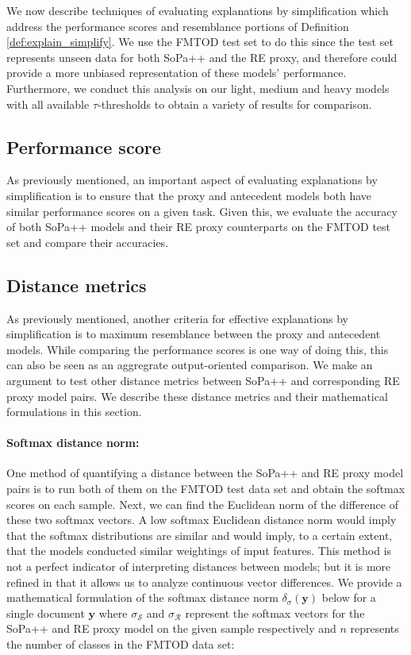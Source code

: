 We now describe techniques of evaluating explanations by simplification which
address the performance scores and resemblance portions of Definition
\ref{def:explain_simplify}. We use the FMTOD test set to do this since the test
set represents unseen data for both SoPa++ and the RE proxy, and therefore could
provide a more unbiased representation of these models' performance.
Furthermore, we conduct this analysis on our light, medium and heavy models with
all available $\tau$-thresholds to obtain a variety of results for comparison.

\subsection{Performance score}

As previously mentioned, an important aspect of evaluating explanations by
simplification is to ensure that the proxy and antecedent models both have
similar performance scores on a given task. Given this, we evaluate the accuracy
of both SoPa++ models and their RE proxy counterparts on the FMTOD test set and
compare their accuracies.

\subsection{Distance metrics}

As previously mentioned, another criteria for effective explanations by
simplification is to maximum resemblance between the proxy and antecedent
models. While comparing the performance scores is one way of doing this, this
can also be seen as an aggregrate output-oriented comparison. We make an
argument to test other distance metrics between SoPa++ and corresponding RE
proxy model pairs. We describe these distance metrics and their mathematical
formulations in this section.

\paragraph{Softmax distance norm:} One method of quantifying a distance between
the SoPa++ and RE proxy model pairs is to run both of them on the FMTOD test
data set and obtain the softmax scores on each sample. Next, we can find the
Euclidean norm of the difference of these two softmax vectors. A low softmax
Euclidean distance norm would imply that the softmax distributions are similar
and would imply, to a certain extent, that the models conducted similar
weightings of input features. This method is not a perfect indicator of
interpreting distances between models; but it is more refined in that it allows
us to analyze continuous vector differences. We provide a mathematical
formulation of the softmax distance norm $\delta_{\sigma}(\bm{y})$ below for a single
document $\bm{y}$ where $\sigma_{\mathcal{S}}$ and $\sigma_{\mathcal{R}}$ represent the
softmax vectors for the SoPa++ and RE proxy model on the given sample
respectively and $n$ represents the number of classes in the FMTOD data set:

